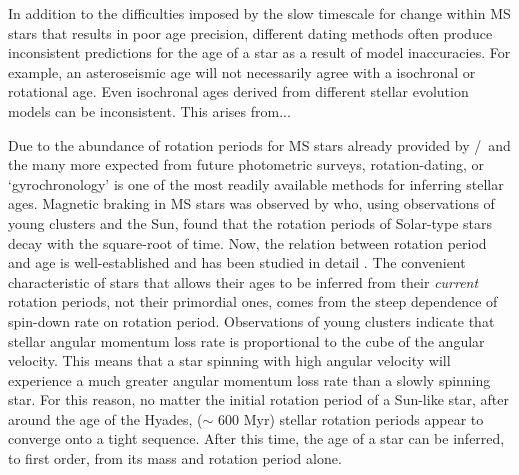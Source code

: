 In addition to the difficulties imposed by the slow timescale for change
within MS stars that results in poor age precision, different dating methods
often produce inconsistent predictions for the age of a star as a result of
model inaccuracies.
For example, an asteroseismic age will not necessarily agree with a isochronal
or rotational age.
Even isochronal ages derived from different stellar evolution models can be
inconsistent.
This arises from...




Due to the abundance of rotation periods for MS stars already provided by
\kepler/\ktwo\ and the many more expected from future photometric surveys,
rotation-dating, or `gyrochronology' is one of the most readily available
methods for inferring stellar ages.
Magnetic braking in MS stars was observed by \citet{Skumanich1972} who, using
observations of young clusters and the Sun, found that the rotation periods of
Solar-type stars decay with the square-root of time.
Now, the relation between rotation period and age is well-established and has
been studied in detail .
The convenient characteristic of stars that allows their ages to be inferred
from their {\it current} rotation periods, not their primordial ones, comes
from the steep dependence of spin-down rate on rotation period.
Observations of young clusters indicate that stellar angular momentum loss
rate is proportional to the cube of the angular velocity.
This means that a star spinning with high angular velocity will experience a
much greater angular momentum loss rate than a slowly spinning star.
For this reason, no matter the initial rotation period of a Sun-like star,
after around the age of the Hyades, ($\sim$ 600 Myr) stellar rotation periods
appear to converge onto a tight sequence.
After this time, the age of a star can be inferred, to first order, from its
mass and rotation period alone.

